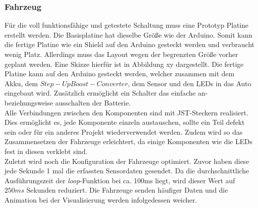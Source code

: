 \documentclass[.../Dokumentation.tex]{subfiles}
\begin{document}
    \subsubsection*{Fahrzeug}
    Für die voll funktionsfähige und getestete Schaltung muss eine Prototyp Platine erstellt werden. Die Basisplatine hat dieselbe Größe wie der Arduino. Somit kann die fertige Platine wie ein Shield auf den Arduino gesteckt werden und verbraucht wenig Platz. Allerdings muss das Layout wegen der begrenzten Größe vorher geplant werden. Eine Skizze hierfür ist in Abbildung xy dargestellt. %
    Die fertige Platine kann auf den Arduino gesteckt werden, welcher zusammen mit dem Akku, dem $Step-Up Boost-Converter$, dem Sensor und den LEDs in das Auto eingebaut wird. Zusätzlich ermöglicht ein Schalter das einfache an- beziehungsweise ausschalten der Batterie.\\
    Alle Verbindungen zwischen den Komponenten sind mit JST-Steckern realisiert. Dies ermöglicht es, jede Komponente einzeln austauschen, sollte ein Teil defekt sein oder für ein anderes Projekt wiederverwendet werden. Zudem wird so das Zusammensetzen der Fahrzeuge erleichtert, da einige Komponenten wie die LEDs fest in diesen verklebt sind.\\
    Zuletzt wird noch die Konfiguration der Fahrzeuge optimiert. Zuvor haben diese jede Sekunde 1 mal die erfassten Sensordaten gesendet. Da die durchschnittliche Ausführungszeit der \emph{loop}-Funktion bei ca. 100ms liegt, wird dieser Wert auf $250ms$ Sekunden reduziert. Die Fahrzeuge senden häufiger Daten und die Animation bei der Visualisierung werden infolgedessen weicher.
    
\end{document}
